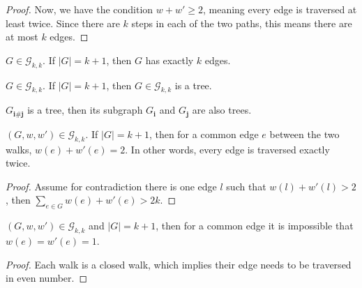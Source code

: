 \begin{proof}
  \notready
  Now, we have the condition $w+w'\ge 2$, meaning every edge is traversed at least twice.
  Since there are $k$ steps in each of the two paths, this means there are at most $k$ edges.
\end{proof}


\begin{lemma}
  \label{lem:exactly_k_edges}
  \notready
  $G \in \mathcal{G}_{k, k}$. If $|G| = k + 1$, then $G$ has exactly $k$ edges.
\end{lemma}


\begin{lemma}
  \label{lem:G_is_tree}
  \notready
  $G \in \mathcal{G}_{k, k}$. If $|G| = k + 1$, then $G \in \mathcal{G}_{k, k}$ is a tree.
\end{lemma}


\begin{lemma}
  \label{lem:subgraph_of_tree}
  \notready
  $G_{\mathbf{i} \# \mathbf{j}}$ is a tree, then its subgraph $G_{\mathbf{i}}$ and $G_{\mathbf{j}}$ are also trees.
\end{lemma}


\begin{lemma}
  \label{lem:traverse_exactly_twice}
  \notready
  $(G, w, w') \in \mathcal{G}_{k, k}$. If $|G| = k + 1$, then for a common edge $e$ between the two
  walks, $w(e) + w'(e) =2$. In other words, every edge is traversed exactly twice.
\end{lemma}

\begin{proof}
  Assume for contradiction there is one edge $l$ such that $w(l) + w'(l) > 2$, then $\sum_{e \in G} w(e) + w'(e) > 2k$.
\end{proof}


\begin{lemma}
  \label{lem:i_j_traverse_once}
  \notready
    $(G, w, w') \in \mathcal{G}_{k, k}$ and $|G| = k + 1$, then for a common edge it is impossible that $w(e) = w'(e) = 1$.
\end{lemma}

\begin{proof}
  Each walk is a closed walk, which implies their edge needs to be traversed in even number.
\end{proof}


